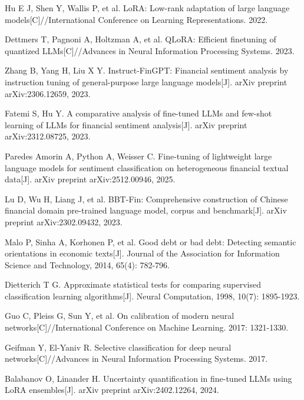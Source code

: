  Hu E J, Shen Y, Wallis P, et al. LoRA: Low-\allowbreak{}rank adaptation of large language models[C]/\allowbreak{}/\allowbreak{}International Conference on Learning Representations. 2022.

 Dettmers T, Pagnoni A, Holtzman A, et al. QLoRA: Efficient finetuning of quantized LLMs[C]/\allowbreak{}/\allowbreak{}Advances in Neural Information Processing Systems. 2023.

 Zhang B, Yang H, Liu X Y. Instruct-\allowbreak{}FinGPT: Financial sentiment analysis by instruction tuning of general-\allowbreak{}purpose large language models[J]. arXiv preprint arXiv:2306.12659, 2023.

 Fatemi S, Hu Y. A comparative analysis of fine-\allowbreak{}tuned LLMs and few-\allowbreak{}shot learning of LLMs for financial sentiment analysis[J]. arXiv preprint arXiv:2312.08725, 2023.

 Paredes Amorin A, Python A, Weisser C. Fine-\allowbreak{}tuning of lightweight large language models for sentiment classification on heterogeneous financial textual data[J]. arXiv preprint arXiv:2512.00946, 2025.

 Lu D, Wu H, Liang J, et al. BBT-\allowbreak{}Fin: Comprehensive construction of Chinese financial domain pre-\allowbreak{}trained language model, corpus and benchmark[J]. arXiv preprint arXiv:2302.09432, 2023.

 Malo P, Sinha A, Korhonen P, et al. Good debt or bad debt: Detecting semantic orientations in economic texts[J]. Journal of the Association for Information Science and Technology, 2014, 65(4): 782-\allowbreak{}796.

 Dietterich T G. Approximate statistical tests for comparing supervised classification learning algorithms[J]. Neural Computation, 1998, 10(7): 1895-\allowbreak{}1923.

 Guo C, Pleiss G, Sun Y, et al. On calibration of modern neural networks[C]/\allowbreak{}/\allowbreak{}International Conference on Machine Learning. 2017: 1321-\allowbreak{}1330.

 Geifman Y, El-\allowbreak{}Yaniv R. Selective classification for deep neural networks[C]/\allowbreak{}/\allowbreak{}Advances in Neural Information Processing Systems. 2017.

 Balabanov O, Linander H. Uncertainty quantification in fine-\allowbreak{}tuned LLMs using LoRA ensembles[J]. arXiv preprint arXiv:2402.12264, 2024.


